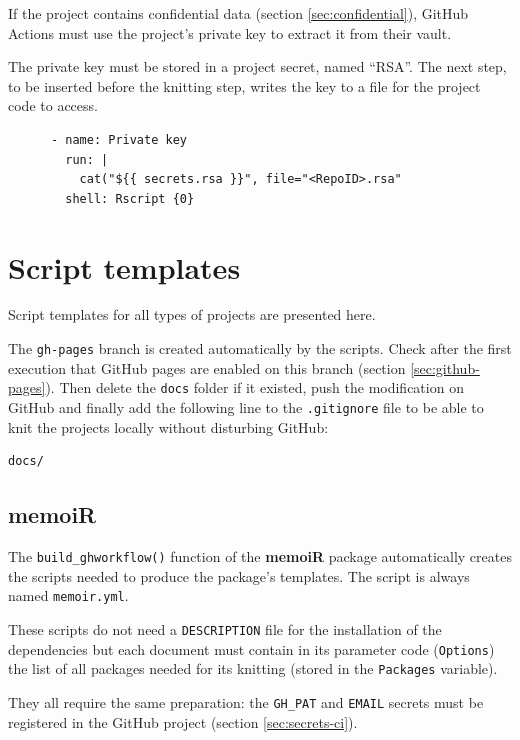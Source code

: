 \documentclass[
  12pt,
  american,
  a4paper,
  extrafontsizes,onecolumn,openright
  ]{memoir}
\begin{document}
If the project contains confidential data (section \ref{sec:confidential}), GitHub Actions must use the project's private key to extract it from their vault.

The private key must be stored in a project secret, named \enquote{RSA}.
The next step, to be inserted before the knitting step, writes the key to a file for the project code to access.

\begin{verbatim}
      - name: Private key
        run: |
          cat("${{ secrets.rsa }}", file="<RepoID>.rsa"
        shell: Rscript {0}
\end{verbatim}

\hypertarget{script-templates}{%
\section{Script templates}\label{script-templates}}

Script templates for all types of projects are presented here.

The \texttt{gh-pages} branch is created automatically by the scripts.
Check after the first execution that GitHub pages are enabled on this branch (section \ref{sec:github-pages}).
Then delete the \texttt{docs} folder if it existed, push the modification on GitHub and finally add the following line to the \texttt{.gitignore} file to be able to knit the projects locally without disturbing GitHub:

\begin{verbatim}
docs/
\end{verbatim}

\hypertarget{sec:memoiR-ci}{%
\subsection{memoiR}\label{sec:memoiR-ci}}

The \texttt{build\_ghworkflow()} function of the \textbf{memoiR} package automatically creates the scripts needed to produce the package's templates.
The script is always named \texttt{memoir.yml}.

These scripts do not need a \texttt{DESCRIPTION} file for the installation of the dependencies but each document must contain in its parameter code (\texttt{Options}) the list of all packages needed for its knitting (stored in the \texttt{Packages} variable).

They all require the same preparation: the \texttt{GH\_PAT} and \texttt{EMAIL} secrets must be registered in the GitHub project (section \ref{sec:secrets-ci}).
\end{document}
